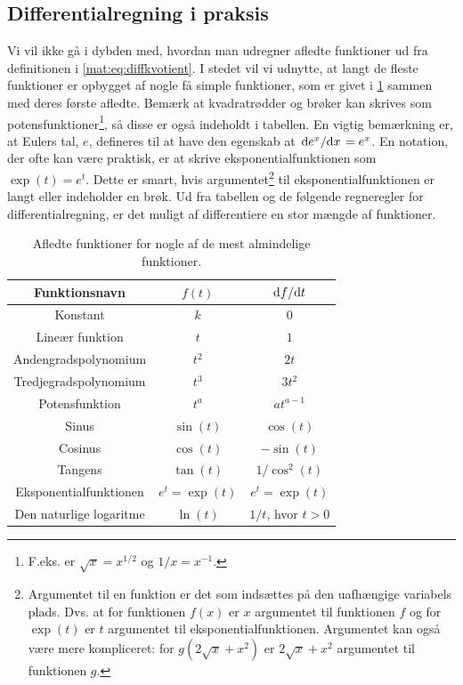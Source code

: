 \subsection{Differentialregning i praksis}
Vi vil ikke gå i dybden med, hvordan man udregner afledte funktioner ud fra definitionen i \cref{mat:eq:diffkvotient}. I stedet vil vi udnytte, at langt de fleste funktioner er opbygget af nogle få simple funktioner, som er givet i \cref{mat:tab:diff} sammen med deres første afledte. Bemærk at kvadratrødder og brøker kan skrives som potensfunktioner\footnote{F.eks. er $\sqrt{x} = x^{1/2}$ og $1/x = x^{-1}$.}, så disse er også indeholdt i tabellen. En vigtig bemærkning er, at Eulers tal, $e$, defineres til at have den egenskab at $\dv*{e^x}{x} = e^x$. En notation, der ofte kan være praktisk, er at skrive eksponentialfunktionen som $\exp(t) = e^t$. Dette er smart, hvis argumentet\footnote{Argumentet til en funktion er det som indsættes på den uafhængige variabels plads. Dvs. at for funktionen $f(x)$ er $x$ argumentet til funktionen $f$ og for $\exp(t)$ er $t$ argumentet til eksponentialfunktionen. Argumentet kan også være mere kompliceret: for $g(2\sqrt{x}+x^2)$ er $2\sqrt{x}+x^2$ argumentet til funktionen $g$.} til eksponentialfunktionen er langt eller indeholder en brøk. Ud fra tabellen og de følgende regneregler for differentialregning, er det muligt af differentiere en stor mængde af funktioner.
%
\setlength{\tabcolsep}{1.2 em}
\def\arraystretch{1.3}
\begin{table}[]
    \centering
    \begin{tabular}{ccc}
    \toprule
    Funktionsnavn & $f(t)$ & $\dv*{f}{t}$ \\%
    \midrule
    Konstant & $k$ & $0$ \\%
    Lineær funktion & $t$ & $1$ \\%
    Andengradspolynomium & $t^2$ & $2t$ \\%
    Tredjegradspolynomium & $t^3$ & $3t^2$ \\%
    Potensfunktion & $t^a$ & $at^{a-1}$ \\%
    Sinus & $\sin(t)$ & $\cos(t)$ \\%
    Cosinus & $\cos(t)$ & $-\sin(t)$ \\%
    Tangens & $\tan(t)$ & $1/\cos^2(t)$ \\%
    Eksponentialfunktionen & $e^t = \exp(t)$ & $e^t = \exp(t)$ \\%
    Den naturlige logaritme & $\ln(t)$ & $1/t$, hvor $t > 0$ \\
    \bottomrule
    \end{tabular}
    \caption{Afledte funktioner for nogle af de mest almindelige funktioner.}
    \label{mat:tab:diff}
\end{table}
%
